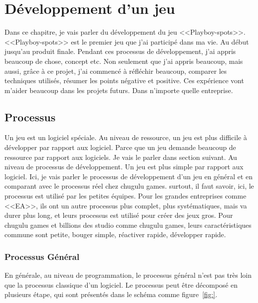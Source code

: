 \chapter{Développement d'un jeu} %
\label{cha:développement_d_un_jeu}

Dans ce chapitre, je vais parler du développement du jeu <<Playboy-spots>>. <<Playboy-spots>> est le premier jeu que j'ai participé dans ma vie. Au début jusqu'au produit finale. Pendant ces processus de développement, j'ai appris beaucoup de chose, concept etc. Non seulement que j'ai appris beaucoup, mais aussi, grâce à ce projet, j'ai commencé à réfléchir beaucoup, comparer les techniques utilisés, résumer les points négative et positive. Ces expérience vont m'aider beaucoup dans les projets futurs. Dans n'importe quelle entreprise.

\section{Processus} %
\label{sec:processus}

Un jeu est un logiciel spéciale. Au niveau de ressource, un jeu est plus difficile à développer par rapport aux logiciel. Parce que un jeu demande beaucoup de ressource par rapport aux logiciels. Je vais le parler dans section suivant. Au niveau de processus de développement. Un jeu est plus simple par rapport aux logiciel. Ici, je vais parler le processus de développement d'un jeu en général et en comparant avec le processus réel chez chugulu games. surtout, il faut savoir, ici, le processus est utilisé par les petites équipes. Pour les grandes entreprises comme <<EA>>, ils ont un autre processus plus complet, plus systématiques, mais va durer plus long, et leurs processus est utilisé pour créer des jeux gros. Pour chugulu games et billions des studio comme chugulu games, leurs caractéristiques commune sont petite, bouger simple, réactiver rapide, développer rapide. 

\subsection{Processus Général} %
\label{sub:processus_général}

En générale, au niveau de programmation, le processus général n'est pas très loin que la processus classique d'un logiciel. Le processus peut être décomposé en plusieurs étape, qui sont présentés dans le schéma comme figure~\ref{fig:}.






